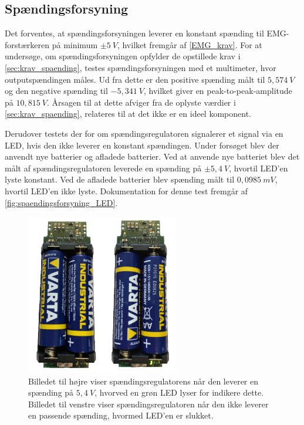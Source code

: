 \subsection{Spændingsforsyning} \label{test_spaendingsforsyning}
Det forventes, at spændingsforsyningen leverer en konstant spænding til EMG-forstærkeren på minimum $\pm 5~V$, hvilket fremgår af \autoref{EMG_krav}. For at undersøge, om spændingsforsyningen opfylder de opstillede krav i \ref{sec:krav_spaending}, testes spændingsforsyningen med et multimeter, hvor outputspændingen måles. %
Ud fra dette er den positive spænding målt til $5,574~V$ og den negative spænding til $-5,341~V$, hvilket giver en peak-to-peak-amplitude på $10,815~V$. Årsagen til at dette afviger fra de oplyste værdier i \autoref{sec:krav_spaending}, relateres til at det ikke er en ideel komponent. 

%
Derudover testets der for om spændingsregulatoren signalerer et signal via en LED, hvis den ikke leverer en konstant spændingen. Under forsøget blev der anvendt nye batterier og afladede batterier. Ved at anvende nye batteriet blev det målt af spændingsregulatoren leverede en spænding på $\pm5,4~V$, hvortil LED'en lyste konstant. Ved de afladede batterier blev spænding målt til  $0,0985~mV$, hvortil LED'en ikke lyste. Dokumentation for denne test fremgår af \autoref{fig:spaendingsforsyning_LED}.


\begin{figure}[H]
\centering
\includegraphics[width=0.6\textwidth]{figures/bat_test}
\caption{Billedet til højre viser spændingsregulatorens når den leverer en spænding på $5,4~V$, hvorved en grøn LED lyser for indikere dette. Billedet til venstre viser spændingsregulatoren når den ikke leverer en passende spænding, hvormed LED'en er slukket.}
\label{fig:spaendingsforsyning_LED}
\end{figure}

